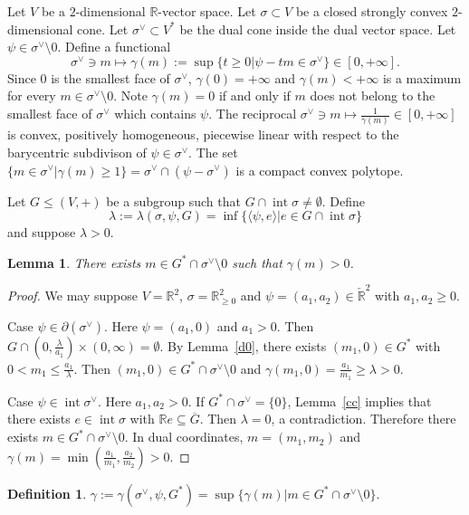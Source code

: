 \documentclass[12pt,reqno]{amsart}
\newcommand{\R}{{\mathbb R}}
\newcommand{\Int}{\operatorname{int}}
\theoremstyle{plain}
\newtheorem{lem}[thm]{Lemma}
\theoremstyle{definition}
\newtheorem{defn}[thm]{Definition}
\theoremstyle{remark}
\begin{document}
Let $V$ be a $2$-dimensional $\R$-vector space. Let $\sigma\subset V$ be a closed strongly convex $2$-dimensional cone. Let $\sigma^\vee\subset V^*$ be the dual cone inside the dual vector space. Let $\psi\in \sigma^\vee\setminus 0$. Define a functional
$$
\sigma^\vee\ni m\mapsto \gamma(m):=\sup\{t\ge 0 \vert \psi-tm\in \sigma^\vee\}
\in [0,+\infty].
$$
Since $0$ is the smallest face of $\sigma^\vee$, $\gamma(0)=+\infty$ and
$\gamma(m)<+\infty$ is a maximum for every $m\in \sigma^\vee\setminus 0$.
Note $\gamma(m)=0$ if and only if $m$ does not belong to the smallest face of $\sigma^\vee$ which contains $\psi$. 
The reciprocal $\sigma^\vee\ni m\mapsto \frac{1}{\gamma(m)}\in [0,+\infty]$ is convex, positively homogeneous, piecewise linear with respect to the barycentric subdivison of $\psi\in \sigma^\vee$.
The set 
$
\{m\in \sigma^\vee \vert \gamma(m)\ge 1 \}=\sigma^\vee\cap (\psi-\sigma^\vee)
$
is a compact convex polytope.

Let $G\le (V,+)$ be a subgroup such that $G\cap \Int \sigma \ne \emptyset$.
Define
$$
\lambda:=\lambda(\sigma,\psi,G)=\inf\{\langle \psi,e\rangle \vert  e\in G\cap \Int \sigma \}
$$
and suppose $\lambda>0$.

\begin{lem}\label{ex} 
There exists $m\in G^*\cap \sigma^\vee \setminus 0$
such that $\gamma(m)>0$.
\end{lem}

\begin{proof} We may suppose $V=\R^2$, $\sigma=\R_{\ge 0}^2$ and $\psi=(a_1,a_2)\in \check{\R}^2$ with 
$a_1,a_2\ge 0$. 

Case $\psi\in \partial(\sigma^\vee)$. Here $\psi=(a_1,0)$
and $a_1>0$. Then $G\cap (0,\frac{\lambda}{a_1})\times (0,\infty)=\emptyset$.
By Lemma~\ref{d0}, there exists $(m_1,0)\in G^*$ with 
$0<m_1\le\frac{a_1}{\lambda}$. Then $(m_1,0)\in G^*\cap \sigma^\vee\setminus 0$
and $\gamma(m_1,0)=\frac{a_1}{m_1}\ge \lambda>0$.

Case $\psi\in \Int \sigma^\vee$. Here $a_1,a_2>0$.
If $G^*\cap \sigma^\vee= \{0\}$,
Lemma~\ref{cc} implies that there exists $e\in \Int \sigma$ with 
$\R e\subseteq \overline{G}$. Then $\lambda=0$, a contradiction.
Therefore there exists $m\in G^*\cap \sigma^\vee\setminus 0$.
In dual coordinates, $m=(m_1,m_2)$ and $\gamma(m)=\min(\frac{a_1}{m_1},\frac{a_2}{m_2})>0$.
\end{proof}

\begin{defn}
$\gamma:=\gamma(\sigma^\vee,\psi,G^*)=\sup\{\gamma(m) \vert m\in G^*\cap \sigma^\vee\setminus 0\}$.
\end{defn}
\end{document}
